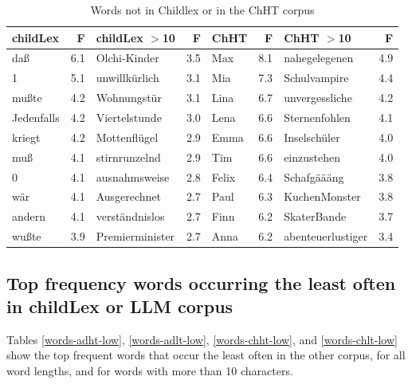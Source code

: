 \documentclass[manuscript]{stjour}
\begin{document}
\begin{table}[!htbp]
\caption{Words not in Childlex or in the ChHT corpus}
\centering
\begin{tabular}{lrlrlrlr}
  \hline
childLex & F & childLex $>$10 & F & ChHT & F & ChHT $>$10 & F \\ 
  \hline
daß & 6.1 & Olchi-Kinder & 3.5 & Max & 8.1 & nahegelegenen & 4.9 \\ 
  1 & 5.1 & unwillkürlich & 3.1 & Mia & 7.3 & Schulvampire & 4.4 \\ 
  mußte & 4.2 & Wohnungstür & 3.1 & Lina & 6.7 & unvergessliche & 4.2 \\ 
  Jedenfalls & 4.2 & Viertelstunde & 3.0 & Lena & 6.6 & Sternenfohlen & 4.1 \\ 
  kriegt & 4.2 & Mottenflügel & 2.9 & Emma & 6.6 & Inselschüler & 4.0 \\ 
  muß & 4.1 & stirnrunzelnd & 2.9 & Tim & 6.6 & einzustehen & 4.0 \\ 
  0 & 4.1 & ausnahmsweise & 2.8 & Felix & 6.4 & Schafgäääng & 3.8 \\ 
  wär & 4.1 & Ausgerechnet & 2.7 & Paul & 6.3 & KuchenMonster & 3.8 \\ 
  andern & 4.1 & verständnislos & 2.7 & Finn & 6.2 & SkaterBande & 3.7 \\ 
  wußte & 3.9 & Premierminister & 2.7 & Anna & 6.2 & abenteuerlustiger & 3.4 \\  
   \hline
\end{tabular}
\label{words-chht}
\end{table}

\clearpage

\subsection{Top frequency words occurring the least often in childLex or LLM corpus}

Tables \ref{words-adht-low}, \ref{words-adlt-low}, \ref{words-chht-low}, and \ref{words-chlt-low} show the top frequent words that occur the least often in the other corpus, for all word lengths, and for words with more than 10 characters.
\end{document}
